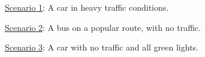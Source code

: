 \documentclass[handout]{ximera}
\begin{document}
\begin{problem}
\begin{question}
\underline{Scenario 1}: A car in heavy traffic conditions.
\begin{multipleChoice}
\end{multipleChoice}
\end{question}

\begin{question}
\underline{Scenario 2}: A bus on a popular route, with no traffic.
\begin{multipleChoice}
\end{multipleChoice}
\end{question}

\begin{question}
\underline{Scenario 3}: A car with no traffic and all green lights.
\begin{multipleChoice}
\end{multipleChoice}
\end{question}

\end{problem}
\end{document}
